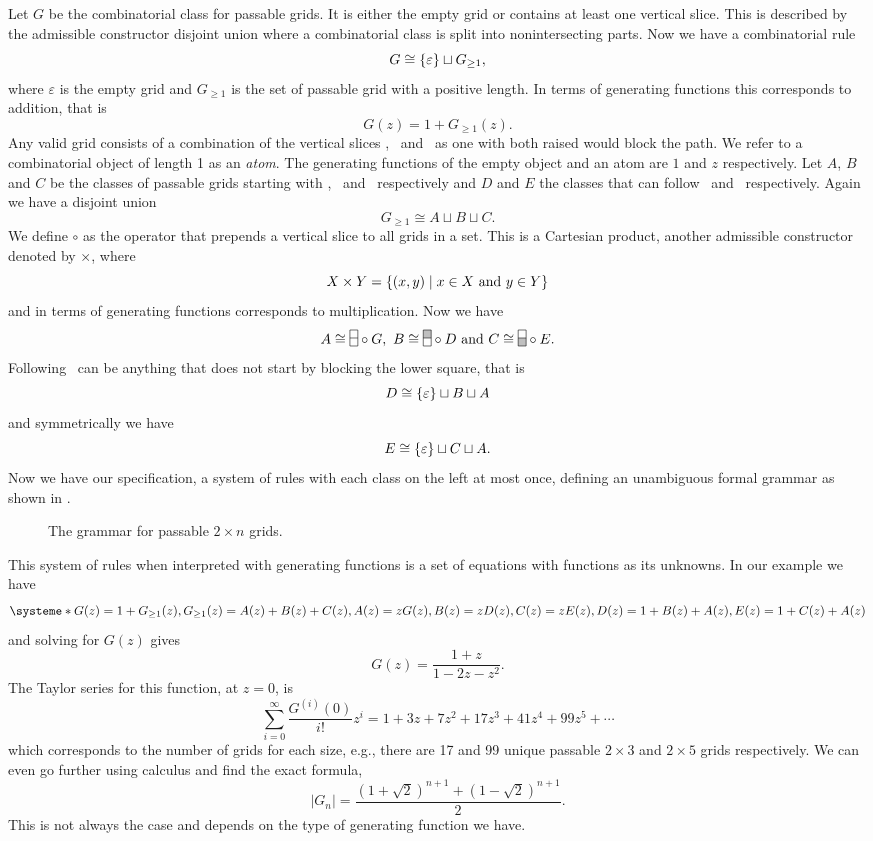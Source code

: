 Let $G$ be the combinatorial class for passable grids. It is either the empty grid or contains at least one vertical slice. This is described by the admissible constructor disjoint union where a combinatorial class is split into nonintersecting parts. Now we have a combinatorial rule 
\[
    G \cong \left\{\varepsilon\right\} \sqcup G_{\geq 1},
\]
where $\varepsilon$ is the empty grid and $G_{\geq 1}$ is the set of passable grid with a positive length. In terms of generating functions this corresponds to addition, that is 
\[
    G(z) = 1 + G_{\geq1}(z).
\] 
Any valid grid consists of a combination of the vertical slices \gridN, \gridU\ and \gridD\ as one with both raised would block the path. We refer to a combinatorial object of length 1 as an \emph{atom}. The generating functions of the empty object and an atom are $1$ and $z$ respectively. Let $A$, $B$ and $C$ be the classes of passable grids starting with \gridN, \gridU\ and \gridD\ respectively and $D$ and $E$ the classes that can follow \gridU\ and \gridD\ respectively. Again we have a disjoint union 
\[
    G_{\geq1} \cong A \sqcup B \sqcup C.
\]
We define $\circ$ as the operator that prepends a vertical slice to all grids in a set. This is a Cartesian product, another admissible constructor denoted by $\times$, where
\[
X \times Y = \left\{(x,y) \mid x\in X \text{ and } y \in Y\right\}
\]
and in terms of generating functions corresponds to multiplication. Now we have 
\[
    A \cong \gridN \circ G, \ B \cong \gridU \circ D \text{ and } C \cong \gridD \circ E.
\]
Following \gridU\ can be anything that does not start by blocking the lower square, that is 
\[
    D \cong \left\{\varepsilon\right\} \sqcup B \sqcup A
\]
and symmetrically we have 
\[
    E \cong \left\{\varepsilon\right\} \sqcup C \sqcup A.
\]
Now we have our specification, a system of rules with each class on the left at most once, defining an unambiguous formal grammar as shown in .

\begin{figure}[ht!]
    \centering
    
    \caption{The grammar for passable $2\times n$ grids.}
    \label{fig:gridtree}
\end{figure}

This system of rules when interpreted with generating functions is a set of equations with functions as its unknowns. In our example we have
\[
    \systeme*{G(z) = 1 + G_{\geq1}(z), G_{\geq1}(z) = A(z) + B(z) + C(z),A(z) = zG(z), B(z) = zD(z), C(z) = zE(z), D(z) = 1+B(z)+A(z), E(z) = 1+C(z)+A(z)}
\]
and solving for $G(z)$ gives 
\[
    G(z) = \frac{1+z}{1-2z-z^2}.
\]
The Taylor series for this function, at $z=0$, is
\[
    \sum_{i=0}^\infty \frac{G^{(i)}(0)}{i!}z^i = 1+3z+7z^2+17z^3+ 41z^4 + 99z^5 + \dotsm
\]
which corresponds to the number of grids for each size, e.g., there are 17 and 99 unique passable $2\times3$ and $2\times5$ grids respectively. We can even go further using calculus and find the exact formula, 
\[
|G_n| = \frac{\left(1+\sqrt{2}\right)^{n+1} + \left(1-\sqrt{2}\right)^{n+1}}{2}.
\]
This is not always the case and depends on the type of generating function we have.

